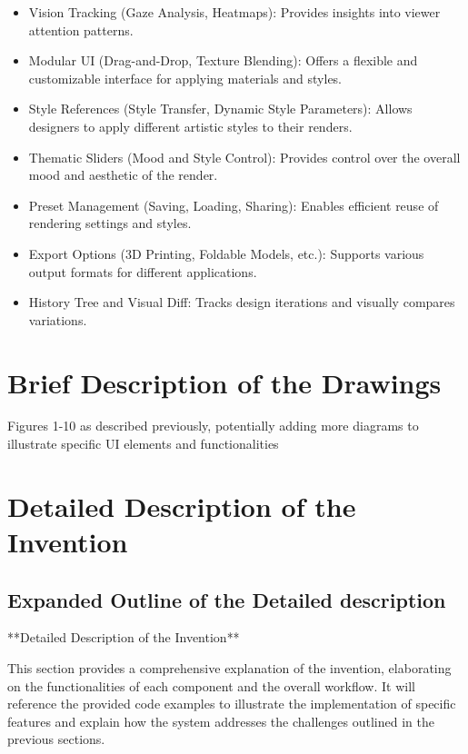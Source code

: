 \documentclass{article}
\begin{document}
\begin{itemize}
    \item Vision Tracking (Gaze Analysis, Heatmaps): Provides insights into viewer attention patterns.

    \item Modular UI (Drag-and-Drop, Texture Blending): Offers a flexible and customizable interface for applying materials and styles.

    \item  Style References (Style Transfer, Dynamic Style Parameters): Allows designers to apply different artistic styles to their renders.

    \item Thematic Sliders (Mood and Style Control): Provides control over the overall mood and aesthetic of the render.

    \item Preset Management (Saving, Loading, Sharing): Enables efficient reuse of rendering settings and styles.

    \item Export Options (3D Printing, Foldable Models, etc.): Supports various output formats for different applications.

    \item History Tree and Visual Diff: Tracks design iterations and visually compares variations.

\end{itemize}

\section{Brief Description of the Drawings}

Figures 1-10 as described previously, potentially adding more diagrams to illustrate specific UI elements and functionalities


\section{Detailed Description of the Invention}

\subsection{Expanded Outline of the Detailed description}
**Detailed Description of the Invention**

This section provides a comprehensive explanation of the invention, elaborating on the functionalities of each component and the overall workflow.  It will reference the provided code examples to illustrate the implementation of specific features and explain how the system addresses the challenges outlined in the previous sections.
\end{document}
